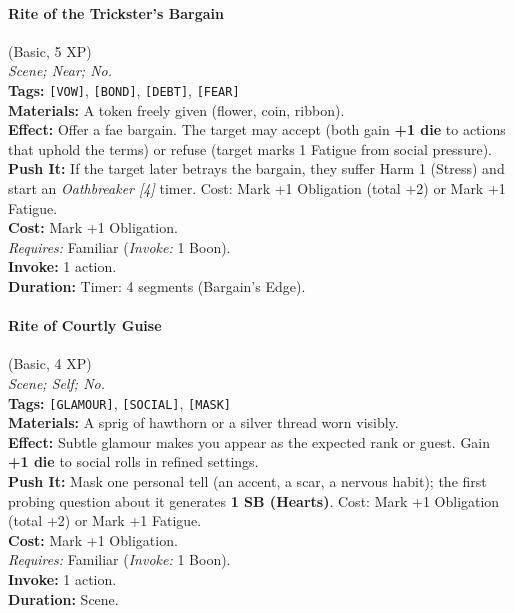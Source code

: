 \paragraph{Rite of the Trickster's Bargain} (Basic, 5 XP) \hfill \\
\emph{Scene; Near; No.} \\
\textbf{Tags:} \texttt{[VOW]}, \texttt{[BOND]}, \texttt{[DEBT]}, \texttt{[FEAR]} \\
\textbf{Materials:} A token freely given (flower, coin, ribbon). \\
\textbf{Effect:} Offer a fae bargain. The target may accept (both gain \textbf{+1 die} to actions that uphold the terms) or refuse (target marks 1 Fatigue from social pressure). \\
\textbf{Push It:} If the target later betrays the bargain, they suffer Harm 1 (Stress) and start an \textit{Oathbreaker [4]} timer. Cost: Mark +1 Obligation (total +2) or Mark +1 Fatigue. \\
\textbf{Cost:} Mark +1 Obligation. \\
\textit{Requires:} Familiar (\textit{Invoke:} 1 Boon). \\
\textbf{Invoke:} 1 action. \\
\textbf{Duration:} Timer: 4 segments (Bargain's Edge).

\paragraph{Rite of Courtly Guise} (Basic, 4 XP) \hfill \\
\emph{Scene; Self; No.} \\
\textbf{Tags:} \texttt{[GLAMOUR]}, \texttt{[SOCIAL]}, \texttt{[MASK]} \\
\textbf{Materials:} A sprig of hawthorn or a silver thread worn visibly. \\
\textbf{Effect:} Subtle glamour makes you appear as the expected rank or guest. Gain \textbf{+1 die} to social rolls in refined settings. \\
\textbf{Push It:} Mask one personal tell (an accent, a scar, a nervous habit); the first probing question about it generates \textbf{1 SB (Hearts)}. Cost: Mark +1 Obligation (total +2) or Mark +1 Fatigue. \\
\textbf{Cost:} Mark +1 Obligation. \\
\textit{Requires:} Familiar (\textit{Invoke:} 1 Boon). \\
\textbf{Invoke:} 1 action. \\
\textbf{Duration:} Scene.

